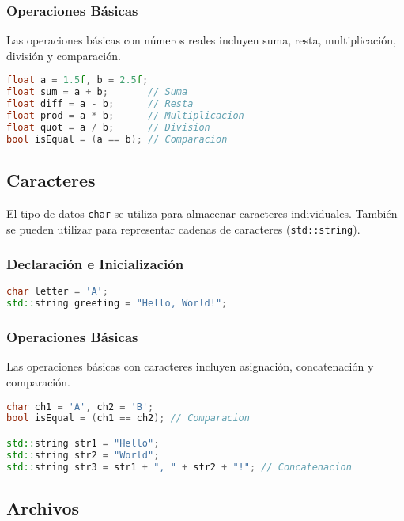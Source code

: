 \subsubsection{Operaciones Básicas}

Las operaciones básicas con números reales incluyen suma, resta, multiplicación, división y comparación.

\begin{lstlisting}[language=C++]
float a = 1.5f, b = 2.5f;
float sum = a + b;       // Suma
float diff = a - b;      // Resta
float prod = a * b;      // Multiplicacion
float quot = a / b;      // Division
bool isEqual = (a == b); // Comparacion
\end{lstlisting}

\subsection{Caracteres}

El tipo de datos \texttt{char} se utiliza para almacenar caracteres individuales. También se pueden utilizar para representar cadenas de caracteres (\texttt{std::string}).

\subsubsection{Declaración e Inicialización}

\begin{lstlisting}[language=C++]
char letter = 'A';
std::string greeting = "Hello, World!";
\end{lstlisting}

\subsubsection{Operaciones Básicas}

Las operaciones básicas con caracteres incluyen asignación, concatenación y comparación.

\begin{lstlisting}[language=C++]
char ch1 = 'A', ch2 = 'B';
bool isEqual = (ch1 == ch2); // Comparacion

std::string str1 = "Hello";
std::string str2 = "World";
std::string str3 = str1 + ", " + str2 + "!"; // Concatenacion
\end{lstlisting}

\subsection{Archivos}

